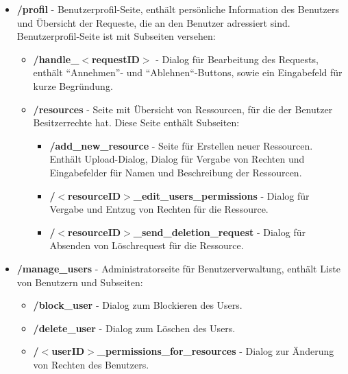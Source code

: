 \documentclass[parskip=full,11pt]{scrartcl}
\renewcommand{\labelitemii}{$\circ$}
\begin{document}
\renewcommand{\labelitemi}{$\bullet$}
\renewcommand{\labelitemii}{$\bullet$}
\renewcommand{\labelitemiii}{$\bullet$}
\begin{itemize}[itemsep=0pt]
\item \textbf{/profil} - Benutzerprofil-Seite, enthält persönliche Information des Benutzers und Übersicht der Requeste, die an den Benutzer adressiert sind.\\

Benutzerprofil-Seite ist mit Subseiten versehen:
\begin{itemize}[itemsep=0pt]
\item \textbf{/handle{\_}$<$requestID$>$} - Dialog für Bearbeitung des Requests, enthält ``Annehmen''- und ``Ablehnen``-Buttons, sowie ein Eingabefeld für kurze Begründung.
\item \textbf{/resources} - Seite mit Übersicht von Ressourcen, für die der Benutzer Besitzerrechte hat. Diese Seite enthält Subseiten:
\begin{itemize}[itemsep=0pt]
\item \textbf{/add{\_}new{\_}resource} - Seite für Erstellen neuer Ressourcen. Enthält Upload-Dialog, Dialog für Vergabe von Rechten und Eingabefelder für Namen und Beschreibung der Ressourcen.
\item \textbf{/$<$resourceID$>${\_}edit{\_}users{\_}permissions} - Dialog für Vergabe und Entzug von Rechten für die Ressource.
\item \textbf{/$<$resourceID$>${\_}send{\_}deletion{\_}request} - Dialog für Absenden von Löschrequest für die Ressource.
\end{itemize}
\end{itemize}


\item \textbf{/manage{\_}users} - Administratorseite für Benutzerverwaltung, enthält Liste von Benutzern und Subseiten:
\begin{itemize}[itemsep=0pt]
\item \textbf{/block{\_}user} - Dialog zum Blockieren des Users.
\item \textbf{/delete{\_}user} - Dialog zum Löschen des Users.
\item \textbf{/$<$userID$>${\_}permissions{\_}for{\_}resources} - Dialog zur Änderung von Rechten des Benutzers.
\end{itemize}


\end{itemize}
\end{document}
